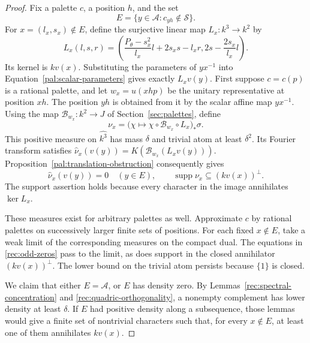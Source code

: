 \begin{proof}
Fix a palette \(c\), a position \(h\), and the set
\[
 E=\{y\in\mathcal A:c_{yh}\notin\mathcal S\}.
\]
For \(x=(l_x,s_x)\notin E\), define the surjective linear map
\(L_x:k^3\to k^2\) by
\begin{equation}\label{rec:linear-map}
 L_x(l,s,r)=
 \left(\frac{P_\theta-s_x^2}{l_x}l+2s_xs-l_xr,
       2s-\frac{2s_x}{l_x}l\right).
\end{equation}
Its kernel is \(kv(x)\).  Substituting the parameters of \(yx^{-1}\)
into Equation~\ref{pal:scalar-parameters} gives exactly
\(L_xv(y)\).  First suppose \(c=c(p)\) is a rational palette, and let
\(w_x=u(xhp)\) be the unitary representative at position \(xh\).
The position \(yh\) is obtained from it by the scalar affine map
\(yx^{-1}\).  Using the map \(\mathcal B_{w_x}:k^2\to J\) of
Section~\ref{sec:palettes}, define
\[
 \nu_x=
 \bigl(\chi\longmapsto\chi\circ\mathcal B_{w_x}\circ L_x\bigr)_*
 \sigma.
\]
This positive measure on \(\widehat{k^3}\) has mass \(\delta\) and
trivial atom at least \(\delta^2\).  Its Fourier transform satisfies
\(\widehat\nu_x(v(y))=K(\mathcal B_{w_x}(L_xv(y)))\).
Proposition~\ref{pal:translation-obstruction} consequently gives
\begin{equation}\label{rec:odd-zeros}
 \widehat\nu_x(v(y))=0\quad(y\in E),\qquad
 \operatorname{supp}\nu_x\subseteq(kv(x))^\perp.
\end{equation}
The support assertion holds because every character in the image
annihilates \(\ker L_x\).

These measures exist for arbitrary palettes as well.  Approximate \(c\)
by rational palettes on successively larger finite sets of positions.
For each fixed \(x\notin E\), take a weak limit of the corresponding
measures on the compact dual.  The equations in
\eqref{rec:odd-zeros} pass to the limit, as does support in the closed
annihilator \((kv(x))^\perp\).  The lower bound on the trivial atom
persists because \(\{1\}\) is closed.

We claim that either \(E=\mathcal A\), or \(E\) has density zero.
By Lemmas~\ref{rec:spectral-concentration} and
\ref{rec:quadric-orthogonality}, a nonempty complement has lower density
at least \(\delta\).  If \(E\) had positive density along a
subsequence, those lemmas would give a finite set of nontrivial
characters such that, for every \(x\notin E\), at least one of them
annihilates \(kv(x)\).


\end{proof}
